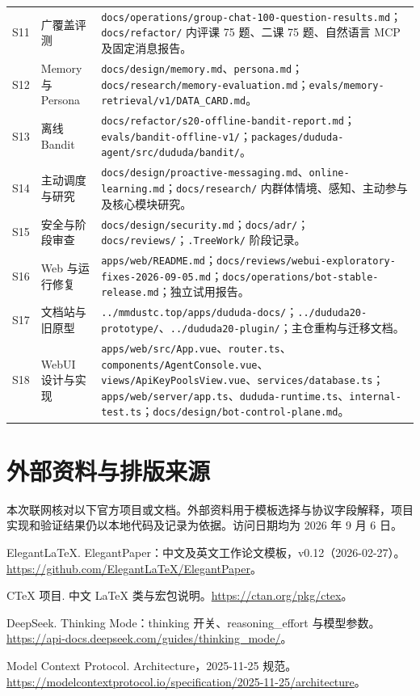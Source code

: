 \begin{longtable}{@{}L{9mm}L{44mm}L{96mm}@{}}
S11 & 广覆盖评测 & \nolinkurl{docs/operations/group-chat-100-question-results.md}；\nolinkurl{docs/refactor/} 内评课 75 题、二课 75 题、自然语言 MCP 及固定消息报告。\\
S12 & Memory 与 Persona & \nolinkurl{docs/design/memory.md}、\nolinkurl{persona.md}；\nolinkurl{docs/research/memory-evaluation.md}；\nolinkurl{evals/memory-retrieval/v1/DATA_CARD.md}。\\
S13 & 离线 Bandit & \nolinkurl{docs/refactor/s20-offline-bandit-report.md}；\nolinkurl{evals/bandit-offline-v1/}；\nolinkurl{packages/dududa-agent/src/dududa/bandit/}。\\
S14 & 主动调度与研究 & \nolinkurl{docs/design/proactive-messaging.md}、\nolinkurl{online-learning.md}；\nolinkurl{docs/research/} 内群体情境、感知、主动参与及核心模块研究。\\
S15 & 安全与阶段审查 & \nolinkurl{docs/design/security.md}；\nolinkurl{docs/adr/}；\nolinkurl{docs/reviews/}；\nolinkurl{.TreeWork/} 阶段记录。\\
S16 & Web 与运行修复 & \nolinkurl{apps/web/README.md}；\nolinkurl{docs/reviews/webui-exploratory-fixes-2026-09-05.md}；\nolinkurl{docs/operations/bot-stable-release.md}；独立试用报告。\\
S17 & 文档站与旧原型 & \nolinkurl{../mmdustc.top/apps/dududa-docs/}；\nolinkurl{../dududa20-prototype/}、\nolinkurl{../dududa20-plugin/}；主仓重构与迁移文档。\\
S18 & WebUI 设计与实现 & \nolinkurl{apps/web/src/App.vue}、\nolinkurl{router.ts}、\nolinkurl{components/AgentConsole.vue}、\nolinkurl{views/ApiKeyPoolsView.vue}、\nolinkurl{services/database.ts}；\nolinkurl{apps/web/server/app.ts}、\nolinkurl{dududa-runtime.ts}、\nolinkurl{internal-test.ts}；\nolinkurl{docs/design/bot-control-plane.md}。\\\bottomrule
\end{longtable}
\endgroup

\section{外部资料与排版来源}
本次联网核对以下官方项目或文档。外部资料用于模板选择与协议字段解释，项目实现和验证结果仍以本地代码及记录为依据。访问日期均为 2026 年 9 月 6 日。

\begin{description}[leftmargin=3em,style=nextline]
\item[W1] ElegantLaTeX. ElegantPaper：中文及英文工作论文模板，v0.12（2026-02-27）。\url{https://github.com/ElegantLaTeX/ElegantPaper}。
\item[W2] CTeX 项目. 中文 LaTeX 类与宏包说明。\url{https://ctan.org/pkg/ctex}。
\item[W3] DeepSeek. Thinking Mode：thinking 开关、reasoning\_effort 与模型参数。\url{https://api-docs.deepseek.com/guides/thinking_mode/}。
\item[W4] Model Context Protocol. Architecture，2025-11-25 规范。\url{https://modelcontextprotocol.io/specification/2025-11-25/architecture}。
\end{description}


